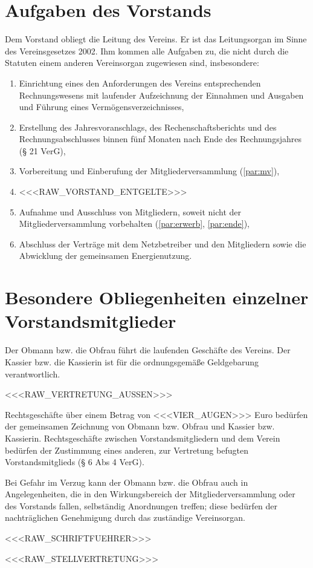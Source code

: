\documentclass[a4paper,11pt]{article}
\begin{document}
\section{Aufgaben des Vorstands}\label{par:vorstandaufgaben}
Dem Vorstand obliegt die Leitung des Vereins. Er ist das \glqq{}Leitungsorgan\grqq{} im Sinne des Vereinsgesetzes 2002.
Ihm kommen alle Aufgaben zu, die nicht durch die Statuten einem anderen Vereinsorgan zugewiesen sind, insbesondere:
\begin{enumerate}[label=\alph*)]
  \item Einrichtung eines den Anforderungen des Vereins entsprechenden Rechnungswesens mit laufender Aufzeichnung der
        Einnahmen und Ausgaben und Führung eines Vermögensverzeichnisses,
  \item Erstellung des Jahresvoranschlags, des Rechenschaftsberichts und des Rechnungsabschlusses binnen fünf Monaten
        nach Ende des Rechnungsjahres (§ 21 VerG),
  \item Vorbereitung und Einberufung der Mitgliederversammlung (\ref{par:mv}),
  \item <<<RAW_VORSTAND_ENTGELTE>>>
  \item Aufnahme und Ausschluss von Mitgliedern, soweit nicht der Mitgliederversammlung vorbehalten
        (\ref{par:erwerb}, \ref{par:ende}),
  \item Abschluss der Verträge mit dem Netzbetreiber und den Mitgliedern sowie die Abwicklung der gemeinsamen
        Energienutzung.
\end{enumerate}

\section{Besondere Obliegenheiten einzelner Vorstandsmitglieder}\label{par:obliegenheiten}
\begin{absaetze}
  \item Der Obmann bzw. die Obfrau führt die laufenden Geschäfte des Vereins. Der Kassier bzw. die Kassierin ist für
        die ordnungsgemäße Geldgebarung verantwortlich.
  \item <<<RAW_VERTRETUNG_AUSSEN>>>
  \item Rechtsgeschäfte über einem Betrag von <<<VIER_AUGEN>>> Euro bedürfen der gemeinsamen Zeichnung von Obmann bzw.
        Obfrau und Kassier bzw. Kassierin. Rechtsgeschäfte zwischen Vorstandsmitgliedern und dem Verein bedürfen der
        Zustimmung eines anderen, zur Vertretung befugten Vorstandsmitglieds (§ 6 Abs 4 VerG).\label{abs:vieraugen}
  \item Bei Gefahr im Verzug kann der Obmann bzw. die Obfrau auch in Angelegenheiten, die in den Wirkungsbereich der
        Mitgliederversammlung oder des Vorstands fallen, selbständig Anordnungen treffen; diese bedürfen der
        nachträglichen Genehmigung durch das zuständige Vereinsorgan.
  \item <<<RAW_SCHRIFTFUEHRER>>>
  \item <<<RAW_STELLVERTRETUNG>>>\label{abs:vertretung}
\end{absaetze}
\end{document}
